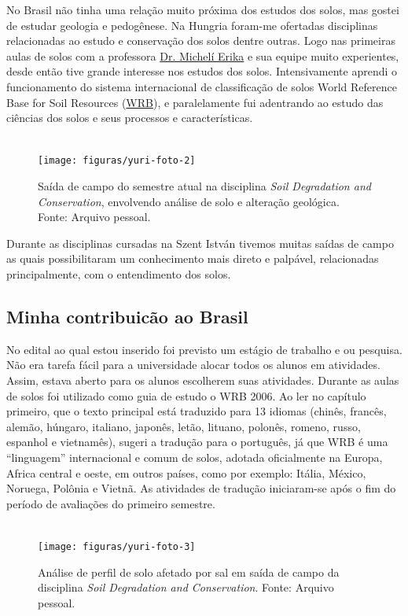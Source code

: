 No Brasil não tinha uma relação muito próxima dos estudos dos solos, mas gostei de estudar geologia e pedogênese. Na Hungria foram-me ofertadas disciplinas relacionadas ao estudo e conservação dos solos dentre outras. Logo nas primeiras aulas de solos com a professora \href{https://www.linkedin.com/profile/view?id=40499203&authType=NAME_SEARCH&authToken=tTwr&locale=en_US&srchid=1909093141405346286275&srchindex=1&srchtotal=1&trk=vsrp_people_res_name&trkInfo=VSRPsearchId\%3A1909093141405346286275\%2CVSRPtargetId\%3A40499203\%2CVSRPcmpt\%3Aprimary}{Dr. Michelí Erika} e sua equipe muito experientes, desde então tive grande interesse nos estudos dos solos. Intensivamente aprendi o funcionamento do sistema internacional de classificação de solos World Reference Base for Soil Resources (\href{http://www.fao.org/soils-portal/soil-survey/soil-classification/world-reference-base/en/}{WRB}), e paralelamente fui adentrando ao estudo das ciências dos solos e seus processos e características.\\
\\
\begin{figure}[htbp]
   \centering
   \texttt{[image: figuras/yuri-foto-2]}
   \caption{Saída de campo do semestre atual na disciplina \textit{Soil Degradation and Conservation}, envolvendo análise de solo e alteração geológica. Fonte: Arquivo pessoal.}
   \label{fig:rótulo-da-figura}
\end{figure}

Durante as disciplinas cursadas na Szent István tivemos muitas saídas de campo as quais possibilitaram um conhecimento mais direto e palpável, relacionadas principalmente, com o entendimento dos solos.

\subsection{Minha contribuicão ao Brasil}

No edital ao qual estou inserido foi previsto um estágio de trabalho e ou pesquisa. Não era tarefa fácil para a universidade alocar todos os alunos em atividades. Assim, estava aberto para os alunos escolherem suas atividades. Durante as aulas de solos foi utilizado como guia de estudo o WRB 2006. Ao ler no capítulo primeiro, que o texto principal está traduzido para 13 idiomas (chinês, francês, alemão, húngaro, italiano, japonês, letão, lituano, polonês, romeno, russo, espanhol e vietnamês), sugeri a tradução para o português, já que WRB é uma ``linguagem'' internacional e comum de solos, adotada oficialmente na Europa, Africa central e oeste, em outros países, como por exemplo: Itália, México, Noruega, Polônia e Vietnã. As atividades de tradução iniciaram-se após o fim do período de avaliações do primeiro semestre.\\
\\
\begin{figure}[htbp]
   \centering
   \texttt{[image: figuras/yuri-foto-3]}
   \caption{Análise de perfil de solo afetado por sal em saída de campo da  disciplina \textit{Soil Degradation and Conservation}. Fonte: Arquivo pessoal.}
\end{figure}

